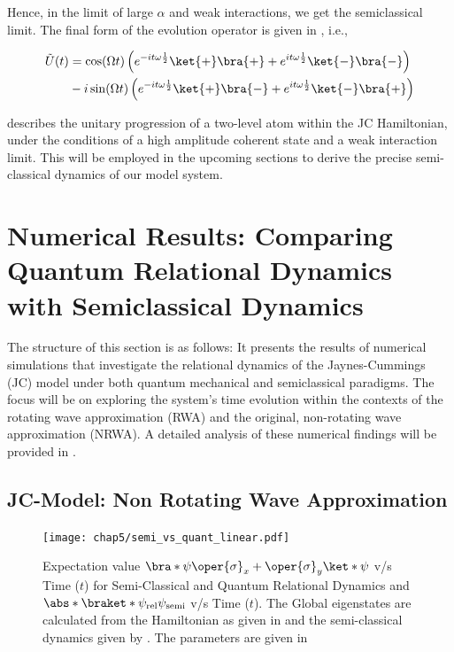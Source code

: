 Hence, in the limit of large \(\alpha\) and weak interactions, we get the 
semiclassical limit. The final form of the evolution operator is given in , i.e., 
\begin{mdframed}
    \begin{align}
    \label{eq:appen_JCM_V_g_limit2}
    \tilde{U}(t) 
    &= \cos(\Omega t) \left(e^{-i t \omega \frac{1}{2}}\ket{+}\bra{+} + 
    e^{i t \omega \frac{1}{2}}\ket{-}\bra{-} \right)  \nonumber \\
    &- i \sin(\Omega t)
     \left( e^{-i t \omega \frac{1}{2}}\ket{+}\bra{-}
    + e^{i t \omega \frac{1}{2}}\ket{-}\bra{+}\right) 
\end{align}
\end{mdframed}
 describes the unitary progression of a two-level atom within the JC Hamiltonian, under the conditions of a high amplitude coherent state and a weak interaction limit. This will be employed in the upcoming sections to derive the precise semi-classical dynamics of our model system. 
\section{Numerical Results: Comparing Quantum Relational Dynamics with Semiclassical Dynamics
\label{sec:chap5_numerical_results}}
The structure of this section is as follows: It presents the results of numerical simulations that investigate the relational dynamics of the Jaynes-Cummings (JC) model under both quantum mechanical and semiclassical paradigms. The focus will be on exploring the system's time evolution within the contexts of the rotating wave approximation (RWA) and the original, non-rotating wave approximation (NRWA). A detailed analysis of these numerical findings will be provided in .
\subsection*{JC-Model: Non Rotating Wave Approximation} 
\begin{figure}[!h]
    \centering
    \texttt{[image: chap5/semi\_vs\_quant\_linear.pdf]}
    \caption{Expectation value
        \(\bra*{\psi} \oper{\sigma}_x + \oper{\sigma}_y \ket*{\psi}\) v/s Time ($t$) for Semi-Classical and Quantum Relational Dynamics
    and \(\abs*{\braket*{\psi_{\mathrm{rel}}}{\psi_{\mathrm{semi}}}}\) v/s Time ($t$). The Global eigenstates are calculated from the Hamiltonian as given in  and the semi-classical dynamics given by . The parameters are given in 
    }
     \label{fig:chap5_linear_semi_vs_quant}
\end{figure}


